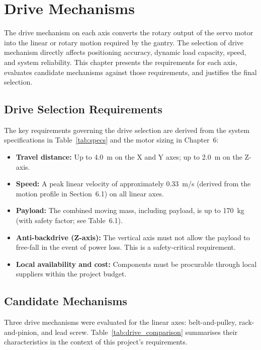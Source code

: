 \chapter{Drive Mechanisms}

The drive mechanism on each axis converts the rotary output of the servo motor into the linear or rotary motion required by the gantry. The selection of drive mechanism directly affects positioning accuracy, dynamic load capacity, speed, and system reliability. This chapter presents the requirements for each axis, evaluates candidate mechanisms against those requirements, and justifies the final selection.

\section{Drive Selection Requirements}

The key requirements governing the drive selection are derived from the system specifications in Table~\ref{tab:specs} and the motor sizing in Chapter~6:

\begin{itemize}
    \item \textbf{Travel distance:} Up to \qty{4.0}{m} on the X and Y axes; up to \qty{2.0}{m} on the Z-axis.
    \item \textbf{Speed:} A peak linear velocity of approximately \qty{0.33}{m/s} (derived from the motion profile in Section~6.1) on all linear axes.
    \item \textbf{Payload:} The combined moving mass, including payload, is up to \qty{170}{kg} (with safety factor; see Table~6.1).
    \item \textbf{Anti-backdrive (Z-axis):} The vertical axis must not allow the payload to free-fall in the event of power loss. This is a safety-critical requirement.
    \item \textbf{Local availability and cost:} Components must be procurable through local suppliers within the project budget.
\end{itemize}

\section{Candidate Mechanisms}

Three drive mechanisms were evaluated for the linear axes: belt-and-pulley, rack-and-pinion, and lead screw. Table~\ref{tab:drive_comparison} summarises their characteristics in the context of this project's requirements.

